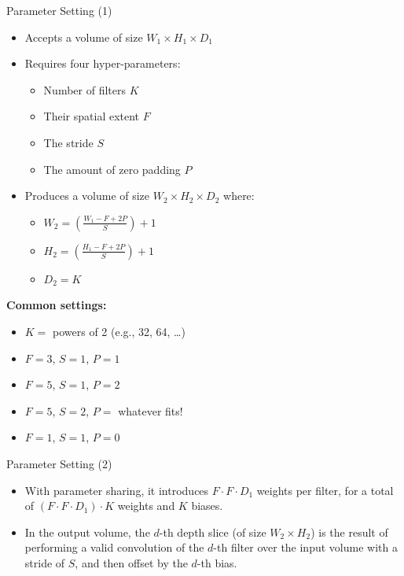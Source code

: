 \documentclass[serif, aspectratio=169]{beamer}
\begin{document}
	\begin{frame}{Parameter Setting (1)}
		\begin{minipage}{0.50\textwidth} %
			\begin{itemize}
				\item Accepts a volume of size $W_1 \times H_1 \times D_1$
				\item Requires four hyper-parameters:
				\begin{itemize}
					\item Number of filters $K$
					\item Their spatial extent $F$
					\item The stride $S$
					\item The amount of zero padding $P$
				\end{itemize}
				
				\item Produces a volume of size $W_2 \times H_2 \times D_2$ where:
				\begin{itemize}
					\item $W_2 = \left( \frac{W_1 - F + 2P}{S} \right) + 1$
					\item $H_2 = \left( \frac{H_1 - F + 2P}{S} \right) + 1$
					\vspace{2pt}
					\item $D_2 = K$
				\end{itemize}
			\end{itemize}
		\end{minipage}
		\hfill %
		\begin{minipage}{0.45\textwidth} %
			\textbf{Common settings:}
			\begin{itemize}
				\item $K =$ powers of 2 (e.g., 32, 64, \dots)
				\item $F = 3$, $S = 1$, $P = 1$
				\item $F = 5$, $S = 1$, $P = 2$
				\item $F = 5$, $S = 2$, $P = $ whatever fits!
				\item $F = 1$, $S = 1$, $P = 0$
			\end{itemize}
		\end{minipage}
	\end{frame}
	\begin{frame}{Parameter Setting (2)}
		\begin{itemize}
			\item With parameter sharing, it introduces $F \cdot F \cdot D_1$ weights per filter, for a total of $(F \cdot F \cdot D_1) \cdot K$ weights and $K$ biases.
			\item In the output volume, the $d$-th depth slice (of size $W_2 \times H_2$) is the result of performing a valid convolution of the $d$-th filter over the input volume with a stride of $S$, and then offset by the $d$-th bias.
		\end{itemize}
	\end{frame}
\end{document}
